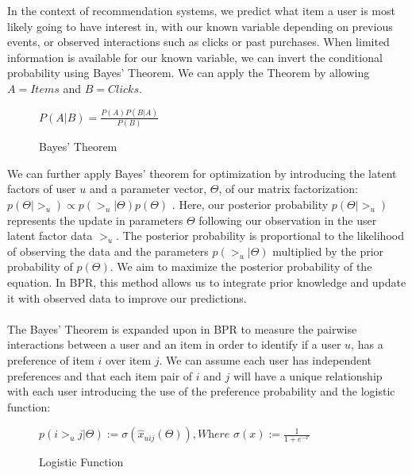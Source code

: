 \documentclass{article}
\begin{document}
In the context of recommendation systems, we predict what item a user is most likely going to have interest in, with our known variable depending on previous events, or observed interactions such as clicks or past purchases. When limited information is available for our known variable, we can invert the conditional probability using Bayes’ Theorem\cite{bayes}. We can apply the Theorem by allowing \(A = Items\) and \(B = Clicks\). 

\begin{figure}[ht]
    \centering
    $P(A|B)=\frac{P(A)P(B|A)}{P(B)}$
    \caption{Bayes' Theorem}
    \label{fig:Bayes-theorem}
\end{figure}

We can further apply Bayes' theorem for optimization by introducing the latent factors of user \(u\) and a parameter vector, \(\Theta\), of our matrix factorization: \(p(\Theta | >_u) \propto p(>_u | \Theta)p(\Theta) \) \cite{bpr-arix}.
Here, our posterior probability \(p(\Theta | >_u)\) represents the update in parameters \(\Theta\) following our observation in the user latent factor data \(>_u\). The posterior probability is proportional to the likelihood of observing the data and the parameters \(p(>_u | \Theta)\) multiplied by the prior probability of \(p(\Theta)\). We aim to maximize the posterior probability of the equation. In BPR, this method allows us to integrate prior knowledge and update it with observed data to improve our predictions. \\~\\
The Bayes’ Theorem is expanded upon in BPR to measure the pairwise interactions between a user and an item in order to identify if a user \(u\), has a preference of item \(i\) over item \(j\). We can assume each user has independent preferences and that each item pair of \(i\) and \(j\) will have a unique relationship with each user introducing the use of the preference probability and the logistic function\cite{bpr-arix}:

\begin{figure}[ht]
    \centering
    $p(i>_u j|\Theta):= \sigma(\hat x_{uij}(\Theta)), \textit{Where } \sigma(x) := \frac{1}{1+e^{-x}} $
    \caption{Logistic Function}
    \label{fig:logistic-func}
\end{figure}
\end{document}
